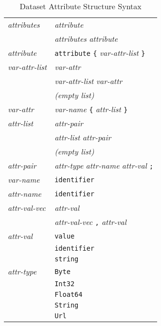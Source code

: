 \begin{table}
\caption{Dataset Attribute Structure Syntax}
\label{tab:DAS}
\small
\begin{center}
\begin{tabular}{ll} \hline
{\em attributes\/} & {\em attribute\/} \\
                 & {\em attributes} {\em attribute\/} \\

{\em attribute\/} & {\tt attribute} {\tt \{} {\em var-attr-list\/} {\tt \}} \\

{\em var-attr-list\/} & {\em var-attr\/} \\
                 & {\em var-attr-list} {\em var-attr\/} \\
		 & {\em (empty list)} \\

{\em var-attr\/} & {\em var-name} 
                {\tt \{} {\em attr-list\/} {\tt \}} \\

{\em attr-list\/} & {\em attr-pair\/} \\
                &  {\em attr-list} {\em attr-pair\/} \\
		 & {\em (empty list)} \\

{\em attr-pair\/} & {\em attr-type} {\em attr-name} {\em attr-val\/} 
                {\tt ;} \\

{\em var-name\/} & {\tt identifier} \\

{\em attr-name\/} & {\tt identifier} \\

{\em attr-val-vec\/} & {\em attr-val\/} \\
                     & {\em attr-val-vec\/} {\tt ,} {\em attr-val\/} \\

{\em attr-val\/} & {\tt value} \\
                 & {\tt identifier} \\
                 & {\tt string} \\

{\em attr-type\/} & {\tt Byte} \\
                  & {\tt Int32} \\
                  & {\tt Float64} \\
                  & {\tt String} \\
                  & {\tt Url} \\

\end{tabular}
\end{center}
\normalsize
\end{table}

